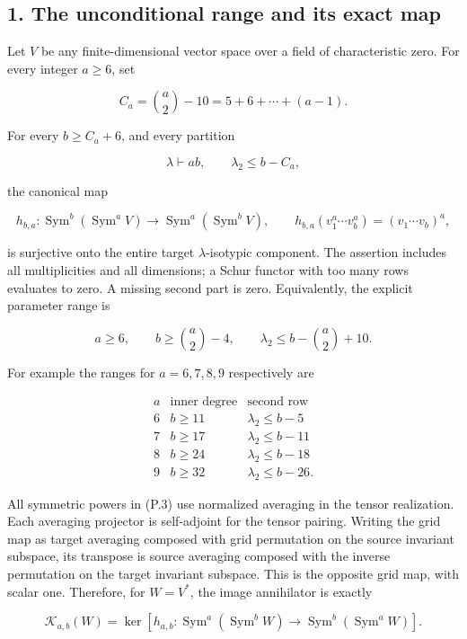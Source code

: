 \documentclass[
  10pt,
]{article}
\begin{document}
\subsection{1. The unconditional range and its exact
map}\label{the-unconditional-range-and-its-exact-map}

Let \(V\) be any finite-dimensional vector space over a field of
characteristic zero. For every integer \(a\ge6\), set

\[
C_a=\binom a2-10=5+6+\cdots+(a-1).
\tag{P.1}
\]

For every \(b\ge C_a+6\), and every partition

\[
\lambda\vdash ab,\qquad \lambda_2\le b-C_a,
\tag{P.2}
\]

the canonical map

\[
h_{b,a}:\operatorname{Sym}^{b}(\operatorname{Sym}^{a}V)
\longrightarrow\operatorname{Sym}^{a}(\operatorname{Sym}^{b}V),
\qquad
h_{b,a}(v_1^a\cdots v_b^a)=(v_1\cdots v_b)^a,
\tag{P.3}
\]

is surjective onto the entire target \(\lambda\)-isotypic component. The
assertion includes all multiplicities and all dimensions; a Schur
functor with too many rows evaluates to zero. A missing second part is
zero. Equivalently, the explicit parameter range is

\[
\boxed{
a\ge6,\qquad b\ge\binom a2-4,\qquad
\lambda_2\le b-\binom a2+10.}
\tag{P.4}
\]

For example the ranges for \(a=6,7,8,9\) respectively are

\[
\begin{array}{c|c|c}
a&\text{inner degree}&\text{second row}\\\hline
6&b\ge11&\lambda_2\le b-5\\
7&b\ge17&\lambda_2\le b-11\\
8&b\ge24&\lambda_2\le b-18\\
9&b\ge32&\lambda_2\le b-26.
\end{array}
\tag{P.5}
\]

All symmetric powers in (P.3) use normalized averaging in the tensor
realization. Each averaging projector is self-adjoint for the tensor
pairing. Writing the grid map as target averaging composed with grid
permutation on the source invariant subspace, its transpose is source
averaging composed with the inverse permutation on the target invariant
subspace. This is the opposite grid map, with scalar one. Therefore, for
\(W=V^*\), the image annihilator is exactly

\[
\mathcal K_{a,b}(W)
=\ker\left[h_{a,b}:\operatorname{Sym}^{a}(\operatorname{Sym}^{b}W)
\longrightarrow\operatorname{Sym}^{b}(\operatorname{Sym}^{a}W)\right].
\tag{P.6}
\]
\end{document}
